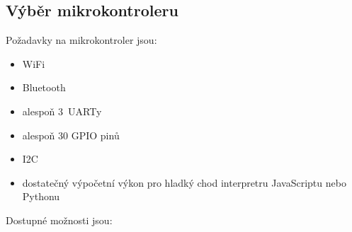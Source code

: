 \subsection{Výběr mikrokontroleru \label{subs:vyberMikrokontroleru}}
Požadavky na mikrokontroler jsou:
\begin{itemize}
    \item WiFi
    \item Bluetooth
    \item alespoň 3~UARTy
    \item alespoň 30 GPIO pinů
    \item I2C
    \item dostatečný výpočetní výkon pro hladký chod interpretru JavaScriptu nebo Pythonu
\end{itemize}

Dostupné možnosti jsou:

